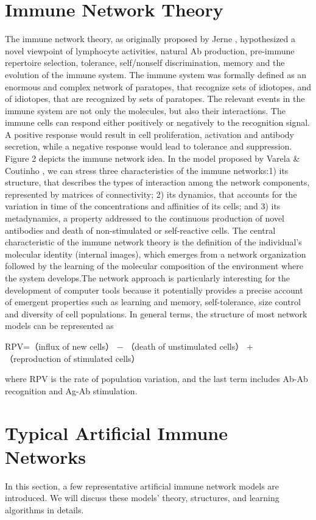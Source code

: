 \documentclass{article}
\begin{document}
\section{Immune Network Theory}
The immune network theory, as originally proposed by Jerne , hypothesized a novel viewpoint of lymphocyte activities, natural Ab production, pre-immune repertoire selection, tolerance, self/nonself discrimination, memory and the evolution of the immune system. The immune system was formally defined as an enormous and complex network of paratopes, that recognize sets of idiotopes, and of idiotopes, that are recognized by sets of paratopes. The relevant events in the immune system are not only the molecules, but also their interactions. The immune cells can respond either positively or negatively to the recognition signal. A positive response would result in
cell proliferation, activation and antibody secretion, while a negative response would lead to tolerance and suppression. Figure 2 depicts the immune network idea.
In the model proposed by Varela & Coutinho , we can stress three characteristics of the immune networks:1) its structure, that describes the types of interaction among the network components, represented by matrices of connectivity; 2) its dynamics, that accounts for the variation in time of the concentrations and affinities of its cells; and 3) its metadynamics, a property addressed to the continuous production of novel antibodies and death of non-stimulated or self-reactive cells. The central characteristic of the immune network theory is the definition of the individual’s molecular identity (internal images), which emerges from a network organization followed by the learning of the molecular composition of the environment where the system develops.The network approach is particularly interesting for the development of computer tools because it potentially provides a precise account of emergent properties such as learning and memory, self-tolerance, size control and diversity of cell populations. In general terms, the structure of most network models can be represented as

RPV=（influx of new cells） − （death of unstimulated cells） + （reproduction of stimulated cells）

where RPV is the rate of population variation, and the last term includes Ab-Ab recognition and Ag-Ab stimulation.




\section{Typical Artificial Immune Networks}
In this section, a few representative artificial immune network models are introduced. We will discuss these models’ theory, structures, and learning algorithms in details.
\end{document}
